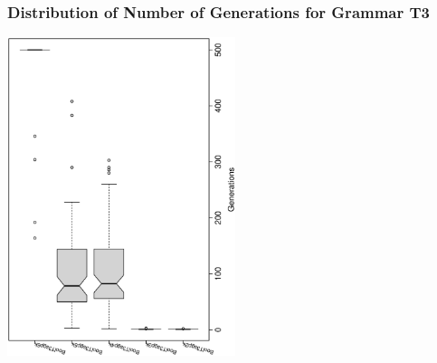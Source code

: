  \begin{frame}
 \frametitle{ Distribution of Number of Generations for Grammar T3 }
 \begin{center}
\includegraphics[width=0.5\textwidth, angle=-90]
{ExpBboxplottGenerations008.eps}
 \end{center}
 \label{ExpBboxplottGenerations008.eps}  
 \end{frame}

